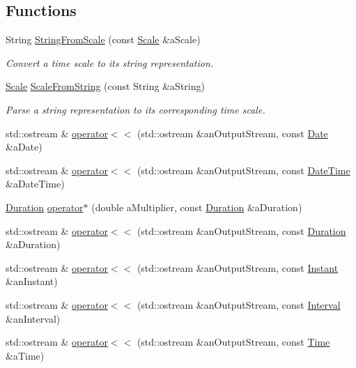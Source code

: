 \subsection*{Functions}
\begin{DoxyCompactItemize}
\item 
String \hyperlink{namespaceostk_1_1physics_1_1time_a92dcdd4abdad01b1f9a2e76560158088}{String\+From\+Scale} (const \hyperlink{namespaceostk_1_1physics_1_1time_adf23d37bd8641fb76a0e98ab46a70df7}{Scale} \&a\+Scale)
\begin{DoxyCompactList}\small\item\em Convert a time scale to its string representation. \end{DoxyCompactList}\item 
\hyperlink{namespaceostk_1_1physics_1_1time_adf23d37bd8641fb76a0e98ab46a70df7}{Scale} \hyperlink{namespaceostk_1_1physics_1_1time_a2c5cdf23bd0ca664bc0c033e4d005d6c}{Scale\+From\+String} (const String \&a\+String)
\begin{DoxyCompactList}\small\item\em Parse a string representation to its corresponding time scale. \end{DoxyCompactList}\item 
std\+::ostream \& \hyperlink{namespaceostk_1_1physics_1_1time_a0019f95c3d716a096edccf30a9edfc19}{operator$<$$<$} (std\+::ostream \&an\+Output\+Stream, const \hyperlink{classostk_1_1physics_1_1time_1_1_date}{Date} \&a\+Date)
\item 
std\+::ostream \& \hyperlink{namespaceostk_1_1physics_1_1time_aecb61cd602a54c13d020a454ff89260c}{operator$<$$<$} (std\+::ostream \&an\+Output\+Stream, const \hyperlink{classostk_1_1physics_1_1time_1_1_date_time}{Date\+Time} \&a\+Date\+Time)
\item 
\hyperlink{classostk_1_1physics_1_1time_1_1_duration}{Duration} \hyperlink{namespaceostk_1_1physics_1_1time_a8622f39865ce8d6d88d9628bae351198}{operator$\ast$} (double a\+Multiplier, const \hyperlink{classostk_1_1physics_1_1time_1_1_duration}{Duration} \&a\+Duration)
\item 
std\+::ostream \& \hyperlink{namespaceostk_1_1physics_1_1time_af077846f664aa623cdb845097c2dc46d}{operator$<$$<$} (std\+::ostream \&an\+Output\+Stream, const \hyperlink{classostk_1_1physics_1_1time_1_1_duration}{Duration} \&a\+Duration)
\item 
std\+::ostream \& \hyperlink{namespaceostk_1_1physics_1_1time_a66eb1ababfa76de94e5b5843203e739c}{operator$<$$<$} (std\+::ostream \&an\+Output\+Stream, const \hyperlink{classostk_1_1physics_1_1time_1_1_instant}{Instant} \&an\+Instant)
\item 
std\+::ostream \& \hyperlink{namespaceostk_1_1physics_1_1time_ac8796248a54fa7099f8fc12f3e64d4da}{operator$<$$<$} (std\+::ostream \&an\+Output\+Stream, const \hyperlink{classostk_1_1physics_1_1time_1_1_interval}{Interval} \&an\+Interval)
\item 
std\+::ostream \& \hyperlink{namespaceostk_1_1physics_1_1time_a20dddd4e5f369552505a3c20e1fbda68}{operator$<$$<$} (std\+::ostream \&an\+Output\+Stream, const \hyperlink{classostk_1_1physics_1_1time_1_1_time}{Time} \&a\+Time)
\end{DoxyCompactItemize}


